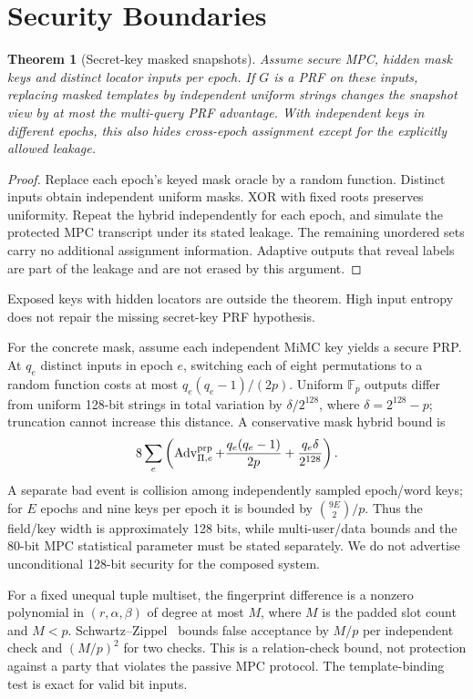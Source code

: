 \documentclass[journal]{IEEEtran}
\newcommand{\Adv}{\operatorname{Adv}}
\newtheorem{theorem}{Theorem}
\begin{document}
\section{Security Boundaries}\label{sec:security}
\begin{theorem}[Secret-key masked snapshots]\label{thm:secret_key}
Assume secure MPC, hidden mask keys and distinct locator inputs per epoch. If $G$ is a PRF on these inputs, replacing masked templates by independent uniform strings changes the snapshot view by at most the multi-query PRF advantage. With independent keys in different epochs, this also hides cross-epoch assignment except for the explicitly allowed leakage.
\end{theorem}
\begin{proof}
Replace each epoch's keyed mask oracle by a random function. Distinct inputs obtain independent uniform masks. XOR with fixed roots preserves uniformity. Repeat the hybrid independently for each epoch, and simulate the protected MPC transcript under its stated leakage. The remaining unordered sets carry no additional assignment information. Adaptive outputs that reveal labels are part of the leakage and are not erased by this argument.
\end{proof}
Exposed keys with hidden locators are outside the theorem. High input entropy does not repair the missing secret-key PRF hypothesis.

For the concrete mask, assume each independent MiMC key yields a secure PRP. At $q_e$ distinct inputs in epoch $e$, switching each of eight permutations to a random function costs at most $q_e(q_e-1)/(2p)$. Uniform $\mathbb F_p$ outputs differ from uniform 128-bit strings in total variation by $\delta/2^{128}$, where $\delta=2^{128}-p$; truncation cannot increase this distance. A conservative mask hybrid bound is
\begin{equation}
8\sum_e\left(\Adv_{\Pi,e}^{\rm prp}+\frac{q_e(q_e-1)}{2p}
+\frac{q_e\delta}{2^{128}}\right).
\end{equation}
A separate bad event is collision among independently sampled epoch/word keys; for $E$ epochs and nine keys per epoch it is bounded by $\binom{9E}{2}/p$. Thus the field/key width is approximately 128 bits, while multi-user/data bounds and the 80-bit MPC statistical parameter must be stated separately. We do not advertise unconditional 128-bit security for the composed system.

For a fixed unequal tuple multiset, the fingerprint difference is a nonzero polynomial in $(r,\alpha,\beta)$ of degree at most $M$, where $M$ is the padded slot count and $M<p$. Schwartz--Zippel~\cite{schwartz1980fast} bounds false acceptance by $M/p$ per independent check and $(M/p)^2$ for two checks. This is a relation-check bound, not protection against a party that violates the passive MPC protocol. The template-binding test is exact for valid bit inputs.
\end{document}
